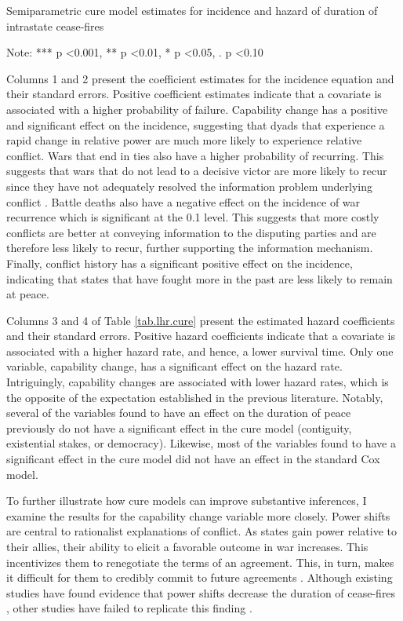\begin{table}
	\caption{Semiparametric cure model estimates for incidence and hazard of duration of intrastate cease-fires} 
	\label{tab.lhr.cure}
	
	Note: *** p \textless 0.001, ** p \textless 0.01, * p \textless 0.05, . p \textless 0.10
\end{table}

Columns 1 and 2 present the coefficient estimates for the incidence equation and their standard errors. Positive coefficient estimates indicate that a covariate is associated with a higher probability of failure. Capability change has a positive and significant effect on the incidence, suggesting that dyads that experience a rapid change in relative power are much more likely to experience relative conflict. Wars that end in ties also have a higher probability of recurring. This suggests that wars that do not lead to a decisive victor are more likely to recur since they have not adequately resolved the information problem underlying conflict \citep{fearon1995}. Battle deaths also have a negative effect on the incidence of war recurrence which is significant at the 0.1 level. This suggests that more costly conflicts are better at conveying information to the disputing parties and are therefore less likely to recur, further supporting the information mechanism. Finally, conflict history has a significant positive effect on the incidence, indicating that states that have fought more in the past are less likely to remain at peace.

Columns 3 and 4 of Table \ref{tab.lhr.cure} present the estimated hazard coefficients and their standard errors. Positive hazard coefficients indicate that a covariate is associated with a higher hazard rate, and hence, a lower survival time. Only one variable, capability change, has a significant effect on the hazard rate. Intriguingly, capability changes are associated with lower hazard rates, which is the opposite of the expectation established in the previous literature. Notably, several of the variables found to have an effect on the duration of peace previously do not have a significant effect in the cure model (contiguity, existential stakes, or democracy). Likewise, most of the variables found to have a significant effect in the cure model did not have an effect in the standard Cox model.

To further illustrate how cure models can improve substantive inferences, I examine the results for the capability change variable more closely. 
Power shifts are central to rationalist explanations of conflict. As states gain power relative to their allies, their ability to elicit a favorable outcome in war increases. This incentivizes them to renegotiate the terms of an agreement. This, in turn, makes it difficult for them to credibly commit to future agreements \citep{fearon1995, powell2006}. Although existing studies have found evidence that power shifts decrease the duration of cease-fires \citep{werner1999, werner2005}, other studies have failed to replicate this finding \citep{fortna2003, lo2008}.

